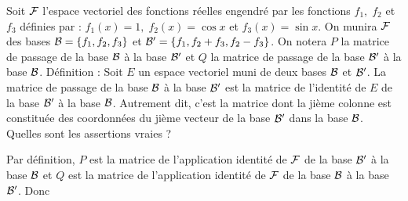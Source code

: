 


\begin{question}
Soit ${\cal F}$ l'espace vectoriel des fonctions réelles engendré par les fonctions $f_1, \; f_2$ et  $f_3$ définies par  : 
$f_1(x)=1, \; f_2(x)=\cos x$ et $f_3(x)= \sin x$. On munira ${\cal F}$ des bases ${\cal B}=\{f_1,f_2,f_3\}$ et ${\cal B}'=\{f_1,f_2+f_3,f_2-f_3\}$. On notera $P$ la matrice de passage de la base $\cal {B}$ à la base $\cal {B}'$ et $Q$ la matrice de passage de la base ${\cal {B'}}$ à la base ${\cal {B}}$.
\vskip1mm
Définition : Soit $E$ un espace vectoriel muni de deux bases ${\cal {B}}$ et ${\cal {B}}'$. La matrice de passage de la base ${\cal {B}}$ à la base  ${\cal {B}}'$ est la matrice de l'identité de $E$ de la base ${\cal {B}}'$ à la base  ${\cal {B}}$. Autrement dit, c'est la matrice dont la jième colonne est constituée des coordonnées du jième vecteur de la base ${\cal {B}'}$ dans la base  ${\cal {B}}$.
\vskip1mm
Quelles sont les assertions vraies ?
\begin{answers}  
\end{answers}
\vskip2mm
\begin{explanations} Par d\'efinition, $P$ est la matrice de l'application identité de ${{\cal F}}$ de la base ${\cal {B}'}$ à la base ${\cal {B}}$ et $Q$ est la matrice de l'application identité de ${{\cal F}}$ de la base ${\cal {B}}$ à la base ${\cal {B'}}$. Donc

\end{explanations}
\end{question}
